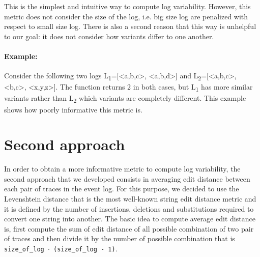\documentclass[12pt]{article}
\begin{document}
\noindent This is the simplest and intuitive way to compute log variability. However, this metric does not consider the size of the log, i.e. big size log are penalized with respect to small size log. There is also a second reason that this way is unhelpful to our goal: it does not consider how variants differ to one another.

\paragraph*{Example:} Consider the following two logs L\textsubscript{1}=[\textless a,b,c\textgreater, \textless a,b,d\textgreater] and L\textsubscript{2}=[\textless a,b,c\textgreater, \textless b,c\textgreater, \textless x,y,z\textgreater]. The function returns 2 in both cases, but L\textsubscript{1} has more similar variants rather than L\textsubscript{2} which variants are completely different. This example shows how poorly informative this metric is.


\section*{Second approach}\label{section:second}

In order to obtain a more informative metric to compute log variability, the second approach that we developed consists in averaging edit distance between each pair of traces in the event log. For this purpose, we decided to use the Levenshtein distance\cite{WEBSITE:1} that is the most well-known string edit distance metric and it is defined by the number of insertions, deletions and substitutions required to convert one string into another. The basic idea to compute average edit distance is, first compute the sum of edit distance of all possible combination of two pair of traces and then divide it by the number of possible combination that is \texttt{size\_of\_log $\cdot$ (size\_of\_log - 1)}.
\end{document}
